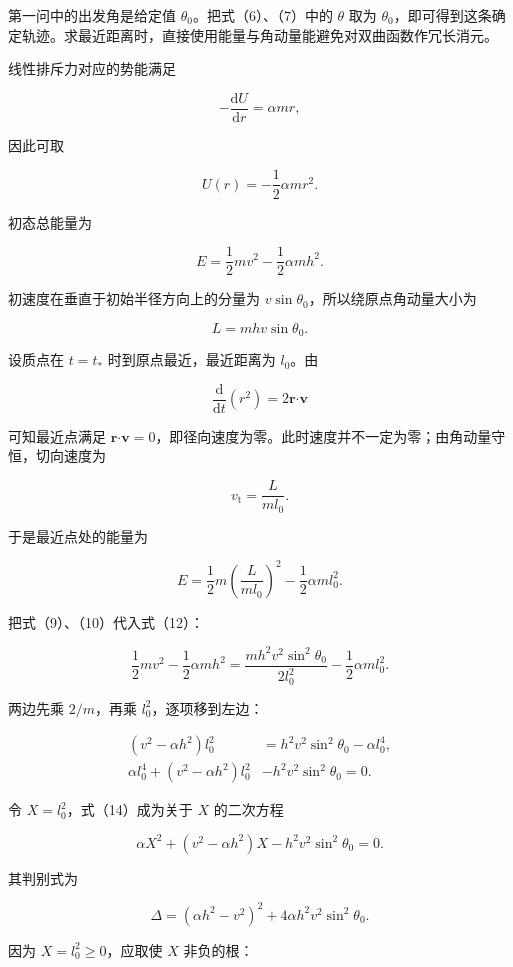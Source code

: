 \documentclass[12pt,a4paper,UTF8]{ctexart}
\begin{document}
第一问中的出发角是给定值 \(\theta_0\)。把式（6）、（7）中的 \(\theta\)
取为
\(\theta_0\)，即可得到这条确定轨迹。求最近距离时，直接使用能量与角动量能避免对双曲函数作冗长消元。

线性排斥力对应的势能满足

\[
-\frac{\mathrm dU}{\mathrm dr}=\alpha mr,
\]

因此可取

\[
U(r)=-\frac12\alpha mr^2.
\tag{8}
\]

初态总能量为

\[
E=\frac12mv^2-\frac12\alpha mh^2.
\tag{9}
\]

初速度在垂直于初始半径方向上的分量为
\(v\sin\theta_0\)，所以绕原点角动量大小为

\[
L=mhv\sin\theta_0.
\tag{10}
\]

设质点在 \(t=t_*\) 时到原点最近，最近距离为 \(l_0\)。由

\[
\frac{\mathrm d}{\mathrm dt}(r^2)=2\boldsymbol r\mathbin{\boldsymbol\cdot}\boldsymbol v
\]

可知最近点满足
\(\boldsymbol r\mathbin{\boldsymbol\cdot}\boldsymbol v=0\)，即径向速度为零。此时速度并不一定为零；由角动量守恒，切向速度为

\[
v_{\mathrm t}=\frac{L}{ml_0}.
\tag{11}
\]

于是最近点处的能量为

\[
E=\frac12m\left(\frac{L}{ml_0}\right)^2
-\frac12\alpha ml_0^2.
\tag{12}
\]

把式（9）、（10）代入式（12）：

\[
\frac12mv^2-\frac12\alpha mh^2
=\frac{m h^2v^2\sin^2\theta_0}{2l_0^2}
-\frac12\alpha ml_0^2.
\tag{13}
\]

两边先乘 \(2/m\)，再乘 \(l_0^2\)，逐项移到左边：

\[
\begin{aligned}
(v^2-\alpha h^2)l_0^2
&=h^2v^2\sin^2\theta_0-\alpha l_0^4,\\
\alpha l_0^4+(v^2-\alpha h^2)l_0^2
&-h^2v^2\sin^2\theta_0=0.
\end{aligned}
\tag{14}
\]

令 \(X=l_0^2\)，式（14）成为关于 \(X\) 的二次方程

\[
\alpha X^2+(v^2-\alpha h^2)X
-h^2v^2\sin^2\theta_0=0.
\tag{15}
\]

其判别式为

\[
\Delta=(\alpha h^2-v^2)^2
+4\alpha h^2v^2\sin^2\theta_0.
\]

因为 \(X=l_0^2\ge0\)，应取使 \(X\) 非负的根：
\end{document}
